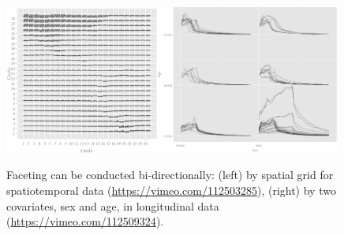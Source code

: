 \documentclass[12pt]{article}
\providecommand{\tabularnewline}{\\}
\begin{document}
\begin{itemize}

\end{itemize}

\begin{figure}[htp]
\begin{center}
\includegraphics[width=0.45\textwidth]{graph/pipeline-24-4}\includegraphics[width=0.54\textwidth]{graph/pipeline-25-2}

\caption{\label{fig:faceting-examples}Faceting can be conducted bi-directionally: (left) by spatial grid for spatiotemporal data (\url{https://vimeo.com/112503285}), (right) by two covariates, sex and age, in longitudinal data (\url{https://vimeo.com/112509324}).}
\end{center}
\end{figure}
\end{document}
